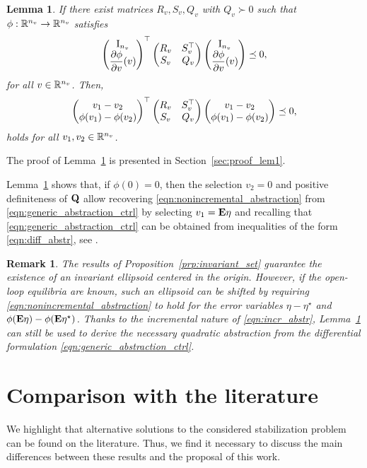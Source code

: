 \documentclass{ifacconf}
\newtheorem{lemma}{Lemma}
\newtheorem{remark}{Remark}
\begin{document}
\begin{lemma}
    \label{lem:diff2incr_abstraction}
    If there exist matrices $R_v,S_v, Q_v$ with $Q_v\succ 0$ such that $\phi:{\mathbb{R}}^{n_v}\to{\mathbb{R}}^{n_v}$ satisfies
    \begin{equation}\label{eqn:diff_abstr}
    \left(\begin{matrix}\operatorname{I}_{n_v}\\\dfrac{\partial \phi}{\partial v}(v)\end{matrix}\right)^\top\left(\begin{matrix}R_v&S_v^\top\\S_v&Q_v\end{matrix}\right)\left(\begin{matrix}\operatorname{I}_{n_v}\\\dfrac{\partial \phi}{\partial v}(v)\end{matrix}\right)\preceq 0,
    \end{equation}
    for all $v\in {\mathbb{R}}^{n_v}$. Then, 
    \begin{equation}\label{eqn:incr_abstr}
        \left(\begin{matrix}v_1-v_2\\\phi(v_1)-\phi(v_2)\end{matrix}\right)^\top\left(\begin{matrix}R_v&S_v^\top\\S_v&Q_v\end{matrix}\right)\left(\begin{matrix}v_1-v_2\\\phi(v_1)-\phi(v_2)\end{matrix}\right)\preceq 0,
    \end{equation}
    holds for all $v_1,v_2\in{\mathbb{R}}^{n_v}$.
\end{lemma}
The proof of Lemma~\ref{lem:diff2incr_abstraction} is presented in Section~\ref{sec:proof_lem1}.

Lemma~\ref{lem:diff2incr_abstraction} shows that, if $\phi(0)=0$, then the selection $v_2 = 0$  and positive definiteness of ${\bf{Q}}$ allow recovering \eqref{eqn:nonincremental_abstraction} from \eqref{eqn:generic_abstraction_ctrl} by selecting $v_1 = {\bf{E}}\eta$ and recalling that \eqref{eqn:generic_abstraction_ctrl} can be obtained from inequalities of the form \eqref{eqn:diff_abstr}, see \citep[Section 2.5]{zoboli2024dynamic}.

\begin{remark}
    The results of Proposition~\ref{prp:invariant_set} guarantee the existence of an invariant ellipsoid centered in the origin. However, if the open-loop equilibria are known, such an ellipsoid can be shifted by requiring \eqref{eqn:nonincremental_abstraction} to hold for the error variables $\eta-\eta^\star$ and $\phi({\bf{E}}\eta)-\phi({\bf{E}}\eta^\star)$. Thanks to the incremental nature of \eqref{eqn:incr_abstr}, Lemma~\ref{lem:diff2incr_abstraction} can still be used to derive the necessary quadratic abstraction from the differential formulation \eqref{eqn:generic_abstraction_ctrl}.
\end{remark}

\section{Comparison with the literature}\label{sec:comparison_lit}
We highlight that alternative solutions to the considered stabilization problem can be found on the literature. Thus, we find it necessary to discuss the main differences between these results and the proposal of this work.
\end{document}
